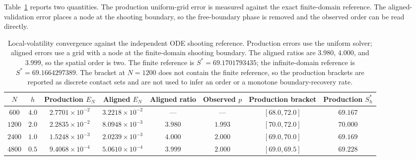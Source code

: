 \documentclass[11pt,a4paper]{article}
\theoremstyle{definition}
\theoremstyle{remark}
\begin{document}
Table~\ref{tab:stage2-convergence} reports two quantities. The production
uniform-grid error is measured against the exact finite-domain reference.
The aligned-validation error places a node at the shooting boundary, so the
free-boundary phase is removed and the observed order can be read directly.

\begin{table}[H]
\centering
\scriptsize
\setlength{\tabcolsep}{3pt}
\begin{tabular}{cccccccc}
\toprule
\textbf{$N$} & \textbf{$h$} & \textbf{Production $E_N$} &
\textbf{Aligned $E_N$} & \textbf{Aligned ratio} & \textbf{Observed $p$} &
\textbf{Production bracket} & \textbf{Production $S_h^*$} \\
\midrule
$600$  & $4.0$  & $2.7701\times10^{-2}$ & $3.2218\times10^{-2}$ & ---     & ---     & $[68.0,72.0]$ & $69.167$ \\
$1200$ & $2.0$  & $2.2835\times10^{-2}$ & $8.0948\times10^{-3}$ & $3.980$ & $1.993$ & $[70.0,72.0]$ & $70.000$ \\
$2400$ & $1.0$  & $1.5248\times10^{-3}$ & $2.0239\times10^{-3}$ & $4.000$ & $2.000$ & $[69.0,70.0]$ & $69.169$ \\
$4800$ & $0.5$  & $9.4068\times10^{-4}$ & $5.0610\times10^{-4}$ & $3.999$ & $2.000$ & $[69.0,69.5]$ & $69.228$ \\
\bottomrule
\end{tabular}
\caption{Local-volatility convergence against the independent ODE shooting
reference. Production errors use the uniform solver; aligned errors use a
grid with a node at the finite-domain shooting boundary. The aligned ratios
are $3.980$, $4.000$, and $3.999$, so the spatial order is two. The finite
reference is \(S^*=69.1701793435\); the infinite-domain reference is
\(S^*=69.1664297389\). The bracket at $N=1200$ does not contain the finite
reference, so the production brackets are reported as discrete contact sets
and are not used to infer an order or a monotone boundary-recovery rate.}
\label{tab:stage2-convergence}
\end{table}
\end{document}

